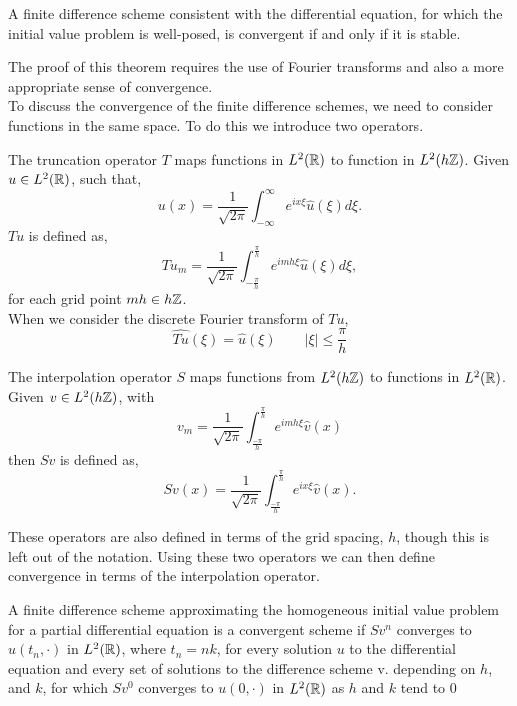\begin{theorem}
A finite difference scheme consistent with the differential equation, for which the initial value problem is well-posed, is convergent if and only if it is stable.
\end{theorem}
The proof of this theorem requires the use of Fourier transforms and also a more appropriate sense of convergence.\\
To discuss the convergence of the finite difference schemes, we need to consider functions in the same space. To do this we introduce two operators. 
\begin{definition}
The truncation operator $T$ maps functions in $L^2(\mathbb{R})$ to function in $L^2(h\mathbb{Z})$. Given $u \in L^2(\mathbb{R})$, such that,
\begin{equation}
u(x)=\frac{1}{\sqrt{2\pi}}\int_{-\infty}^{\infty}e^{ix\xi}\hat{u}(\xi)d\xi. 
\end{equation}   
$Tu$ is defined as,
\begin{equation}
Tu_m=\frac{1}{\sqrt{2\pi}}\int_{-\frac{\pi}{h}}^{\frac{\pi}{h}}e^{imh\xi}\hat{u}(\xi)d\xi, 
\end{equation}
for each grid point $mh\in h\mathbb{Z}$.\\
When we consider the discrete Fourier transform of $Tu$,
\begin{equation}
\widehat{Tu}(\xi)=\hat{u}(\xi) \qquad \lvert\xi\rvert\leq \frac{\pi}{h}
\end{equation} 
\end{definition}
\begin{definition}
The interpolation operator $S$  maps functions from $L^2(h\mathbb{Z})$ to functions in $L^2(\mathbb{R})$. Given $v \in L^2(h\mathbb{Z})$, with 
$$ v_m= \frac{1}{\sqrt{2\pi}}\int_{\frac{-\pi}{h}}^{\frac{\pi}{h}} e^{imh\xi}\hat{v}(x)$$
then $Sv$ is defined as,
$$Sv(x)=\frac{1}{\sqrt{2\pi}}\int_{\frac{-\pi}{h}}^{\frac{\pi}{h}} e^{ix\xi}\hat{v}(x).$$
\end{definition}
These operators are also defined in terms of the grid spacing, $h$, though this is left out of the notation.
Using these two operators we can then define convergence in terms of the interpolation operator.
\begin{definition}
A finite difference scheme approximating  the homogeneous initial value problem for a partial differential equation is a convergent scheme if $Sv^n$ converges to $u(t_n,\cdot)$ in $L^2(\mathbb{R})$, where $t_n=nk$, for every solution $u$ to the differential equation and every set of solutions to the difference scheme v. depending on $h$, and $k$, for which $Sv^0$ converges to $u(0,\cdot)$ in $L^2(\mathbb{R})$ as $h$ and $k$ tend to $0$
\end{definition}

